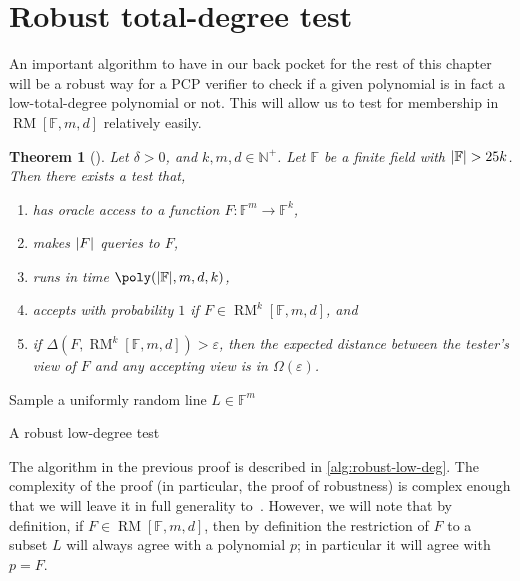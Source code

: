 \documentclass[english,12pt]{reedthesis}
\theoremstyle{plain}
\newtheorem{thm}{Theorem}[section]
\theoremstyle{definition}
\theoremstyle{remark}
\DeclareMathOperator{\RM}{RM}
\DeclarePairedDelimiter{\abs}{\lvert}{\rvert}
\begin{document}
\section{Robust total-degree test}\label{sec:robust-degree}

An important algorithm to have in our back pocket for the rest of this chapter
will be a robust way for a PCP verifier to check if a given polynomial is in
fact a low-total-degree polynomial or not. This will allow us to test for
membership in $\RM[\mathbb{F}, m, d]$ relatively easily.

\begin{thm}[{\cite[Prop.\ 5.7]{Par21}}]\label{thm:robust-low-deg}
  Let $\delta > 0$, and $k, m, d \in \mathbb{N}^{+}$. Let $\mathbb{F}$ be a finite field with
  $\abs{\mathbb{F}} > 25k$. Then there exists a test that,
  \begin{enumerate}
    \item has oracle access to a function $F\colon \mathbb{F}^{m} \rightarrow \mathbb{F}^{k}$,
    \item makes $\abs{F}$ queries to $F$,
    \item runs in time $\poly(\abs{\mathbb{F}}, m, d, k)$,
    \item accepts with probability $1$ if $F \in \RM^{k}[\mathbb{F}, m, d]$, and
    \item if $\Delta(F, \RM^{k}[\mathbb{F}, m, d]) > \varepsilon$, then the expected distance
          between the tester's view of $F$ and any accepting view is in $\Omega(\varepsilon)$.
  \end{enumerate}
\end{thm}

\begin{algorithm}[htbp]
  \KwOut{Whether $F \in \RM[\mathbb{F}, m, d]$}
  Sample a uniformly random line $L \in \mathbb{F}^{m}$\;
  \caption{A robust low-degree test~\cite[Prop.\ 5.7]{Par21}}\label{alg:robust-low-deg}
\end{algorithm}

The algorithm in the previous proof is described in \cref{alg:robust-low-deg}.
The complexity of the proof (in particular, the proof of robustness) is complex
enough that we will leave it in full generality to~\cite{Par21}. However, we
will note that by definition, if $F \in \RM[\mathbb{F}, m, d]$, then by definition
the restriction of $F$ to a subset $L$ will always agree with a polynomial $p$;
in particular it will agree with $p = F$.
\end{document}
